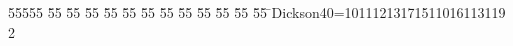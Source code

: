 %
%
\begin{tabbing}
55555 \= 55 \= 55 \= 55 \= 55 \= 55 \= 55 \= 55 \= 55 \= 55 \= 55 \= 55 \= 55 \= \>Dickson40=10111213171511016113119\\[0pt]
2\>\end{tabbing}
